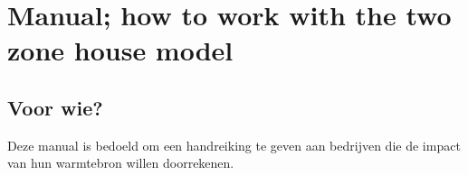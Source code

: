 \section{Manual; how to work with the two zone house model}

\subsection{Voor wie?}
Deze manual is bedoeld om een handreiking te geven aan bedrijven die de impact van hun warmtebron willen doorrekenen.

\newpage
